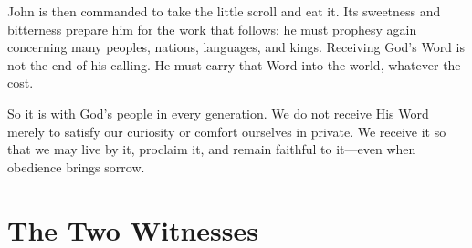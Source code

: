 John is then commanded to take the little scroll and eat it. Its sweetness and bitterness prepare him for the work that follows: he must prophesy again concerning many peoples, nations, languages, and kings. Receiving God's Word is not the end of his calling. He must carry that Word into the world, whatever the cost.

So it is with God's people in every generation. We do not receive His Word merely to satisfy our curiosity or comfort ourselves in private. We receive it so that we may live by it, proclaim it, and remain faithful to it—even when obedience brings sorrow.

\section{The Two Witnesses}

